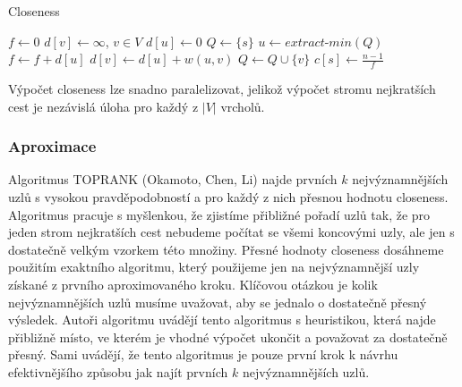 \documentclass[12pt,titlepage]{report}
\begin{document}
\begin{center}
\begin{minipage}{\textwidth}
\begin{algorithm}[H]
	\caption{Closeness}
		\label{alg:closeness}

	\begin{algorithmic}[1]
	\Statex
		\State $f \gets 0$
		\State $d[v] \gets \infty$, $v \in V$
		\State $d[u] \gets 0$
		\State $Q \gets \{s\}$
			\State $u \gets extract\mbox{-}min(Q)$
			\State $f \gets f + d[u]$
					\State $d[v] \gets d[u] + w(u, v)$
					\State $Q \gets Q \cup \{v\}$
				\EndIf
			\EndFor
		\EndWhile
		\State $c[s] \gets \frac{n - 1}{f}$
	\EndFor
	\end{algorithmic}
\end{algorithm}
\end{minipage}
\end{center}
\mbox{}

Výpočet closeness lze snadno paralelizovat, jelikož výpočet stromu nejkratších
cest je nezávislá úloha pro každý z $|V|$ vrcholů.

\subsubsection{Aproximace}
Algoritmus TOPRANK (Okamoto, Chen, Li) najde prvních $k$ nejvýznamnějších uzlů
s vysokou pravděpodobností a pro každý z nich přesnou hodnotu closeness.
Algoritmus pracuje s myšlenkou, že zjistíme přibližné pořadí uzlů tak, že pro
jeden strom nejkratších cest nebudeme počítat se všemi koncovými uzly, ale jen
s dostatečně velkým vzorkem této množiny.  Přesné hodnoty closeness dosáhneme
použitím exaktního algoritmu, který použijeme jen na nejvýznamnější uzly
získané z prvního aproximovaného kroku. Klíčovou otázkou je kolik
nejvýznamnějších uzlů musíme uvažovat, aby se jednalo o dostatečně přesný
výsledek. Autoři algoritmu uvádějí tento algoritmus s heuristikou, která najde
přibližně místo, ve kterém je vhodné výpočet ukončit a považovat za dostatečně
přesný. Sami uvádějí, že tento algoritmus je pouze první krok k návrhu
efektivnějšího způsobu jak najít prvních $k$ nejvýznamnějších uzlů.
\end{document}
